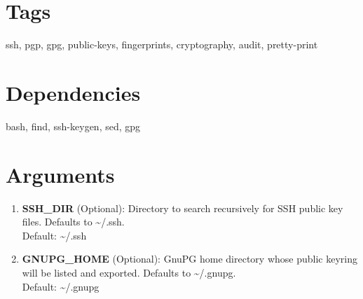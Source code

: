 \documentclass{article}
\begin{document}
\section*{Tags}
ssh, pgp, gpg, public-keys, fingerprints, cryptography, audit, pretty-print

\section*{Dependencies}
bash, find, ssh-keygen, sed, gpg


\section*{Arguments}
\begin{enumerate}
  \item \textbf{SSH\_DIR} (Optional): Directory to search recursively for SSH public key files. Defaults to \textasciitilde{}/.ssh. \\ Default: \textasciitilde{}/.ssh
  \item \textbf{GNUPG\_HOME} (Optional): GnuPG home directory whose public keyring will be listed and exported. Defaults to \textasciitilde{}/.gnupg. \\ Default: \textasciitilde{}/.gnupg
\end{enumerate}
\end{document}
